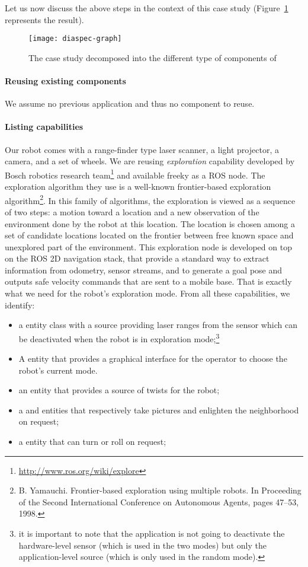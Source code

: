 Let us now discuss the above steps in the context of this case
study (Figure~\ref{fig:diaspec-graph} represents the result).

\begin{figure}
  \centering
  \texttt{[image: diaspec-graph]}
  \caption{The case study decomposed into the different type of
    components of \diaspec{}}
\label{fig:diaspec-graph}
\end{figure}

\paragraph*{Reusing existing components}
We assume no previous \diaspec{} application and thus no \diaspec{}
component to reuse.

\paragraph*{Listing capabilities}
Our robot comes with a range-finder type laser scanner, a light projector, a camera,
and a set of wheels. We are reusing \emph{exploration} capability developed by Bosch robotics research team\footnote{\url{http://www.ros.org/wiki/explore}} and available freeky as a ROS node. The exploration algorithm they use is a well-known frontier-based exploration algorithm\footnote{B. Yamauchi. Frontier-based exploration using multiple robots. In Proceeding of the Second International Conference on Autonomous Agents, pages 47–53, 1998.}. In this family of algorithms, the exploration is viewed as a sequence of two steps: a motion toward a location and a new observation of the environment done by the robot at this location. The location is chosen among a set of candidate locations located on the frontier between free known space and unexplored part of the environment. This exploration node is developed on top on the ROS 2D navigation stack, that provide a standard way to extract information from odometry, sensor streams, and to generate a goal pose and outputs safe velocity commands that are sent to a mobile base. That is exactly what we need for the robot's exploration mode. From all these capabilities, we identify:
\begin{itemize}
\item a  entity class with a  source
  providing laser ranges from the sensor which can be deactivated when
  the robot is in exploration mode;\footnote{it is important to note
    that the application is not going to deactivate the hardware-level
    sensor (which is used in the two modes) but only the
    application-level source (which is only used in the random mode).}
\item A  entity that provides a graphical interface
  for the operator to choose the robot's current mode.
\item an  entity that provides a source of twists for
  the robot;
\item a  and  entities that respectively take
  pictures and enlighten the neighborhood on request;
\item a  entity that can turn or roll on request;
\end{itemize}


